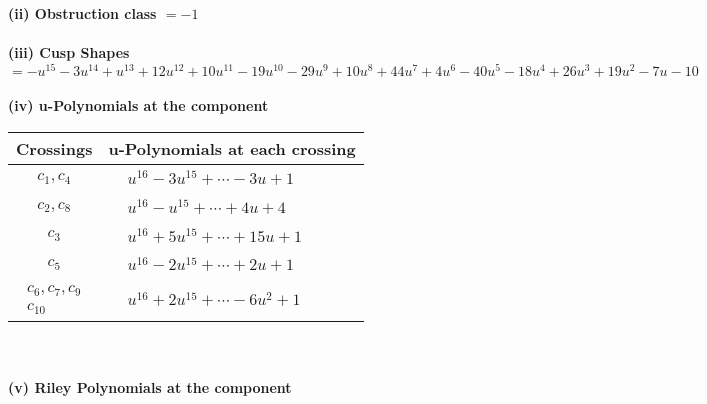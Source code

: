 \documentclass[1p]{elsarticle_modified}
\theoremstyle{definition}
\begin{document}
\flushleft \textbf{(ii) Obstruction class $= -1$}\\~\\
\flushleft \textbf{(iii) Cusp Shapes $= - u^{15}-3 u^{14}+u^{13}+12 u^{12}+10 u^{11}-19 u^{10}-29 u^9+10 u^8+44 u^7+4 u^6-40 u^5-18 u^4+26 u^3+19 u^2-7 u-10$}\\~\\
\newpage\renewcommand{\arraystretch}{1}
\flushleft \textbf{(iv) u-Polynomials at the component}\newline \\
\begin{tabular}{m{50pt}|m{274pt}}
Crossings & \hspace{64pt}u-Polynomials at each crossing \\
\hline $$\begin{aligned}c_{1},c_{4}\end{aligned}$$&$\begin{aligned}
&u^{16}-3 u^{15}+\cdots-3 u+1
\end{aligned}$\\
\hline $$\begin{aligned}c_{2},c_{8}\end{aligned}$$&$\begin{aligned}
&u^{16}- u^{15}+\cdots+4 u+4
\end{aligned}$\\
\hline $$\begin{aligned}c_{3}\end{aligned}$$&$\begin{aligned}
&u^{16}+5 u^{15}+\cdots+15 u+1
\end{aligned}$\\
\hline $$\begin{aligned}c_{5}\end{aligned}$$&$\begin{aligned}
&u^{16}-2 u^{15}+\cdots+2 u+1
\end{aligned}$\\
\hline $$\begin{aligned}c_{6},c_{7},c_{9}\\c_{10}\end{aligned}$$&$\begin{aligned}
&u^{16}+2 u^{15}+\cdots-6 u^2+1
\end{aligned}$\\
\hline
\end{tabular}\\~\\
\newpage\renewcommand{\arraystretch}{1}
\flushleft \textbf{(v) Riley Polynomials at the component}\newline \\
\end{document}
